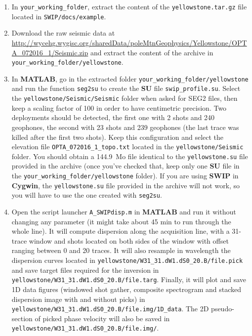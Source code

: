 \documentclass[twoside,a4paper]{article}
\def\SWIP{\textbf{SWIP}}
\def\SU{\textbf{SU}}
\def\MATLAB{\textbf{MATLAB}}
\def\Cygwin{\textbf{Cygwin}}
\begin{document}
\begin{enumerate}[leftmargin=*]
\setlength\itemsep{2ex}
\item In \verb|your_working_folder|, extract the content of the \verb|yellowstone.tar.gz| file located in \verb|SWIP/docs/example|.

\item Download the raw seismic data at \url{http://wycehg.wygisc.org/sharedData/poleMtnGeophysics/Yellowstone/OPTA_072016_1/Seismic.zip} and extract the content of the archive in \verb|your_working_folder/yellowstone|.

\item In {\MATLAB}, go in the extracted folder \verb|your_working_folder/yellowstone| and run the function \verb|seg2su| to create the {\SU} file \verb|swip_profile.su|. Select the \verb|yellowstone/Seismic/Seismic| folder when asked for SEG2 files, then keep a scaling factor of 100 in order to have centimetric precision. Two deployments should be detected, the first one with 2 shots and 240 geophones, the second with 23 shots and 239 geophones (the last trace was killed after the first two shots). Keep this configuration and select the elevation file \verb|OPTA_072016_1_topo.txt| located in the \verb|yellowstone/Seismic| folder. You should obtain a 144.9~Mo file identical to the \verb|yellowstone.su| file provided in the archive (once you've checked that, keep only one {\SU} file in the \verb|your_working_folder/yellowstone| folder). If you are using {\SWIP} in {\Cygwin}, the \verb|yellowstone.su| file provided in the archive will not work, so you will have to use the one created with \verb|seg2su|.

\item Open the script launcher \verb|A_SWIPdisp.m| in {\MATLAB} and run it without changing any parameter (it might take about 45 min to run through the whole line). It will compute dispersion along the acquisition line, with a 31-trace window and shots located on both sides of the window with offset ranging between 0 and 20 traces. It will also resample in wavelength the dispersion curves located in \verb|yellowstone/W31_31.dW1.dS0_20.B/file.pick| and save target files required for the inversion in \verb|yellowstone/W31_31.dW1.dS0_20.B/file.targ|. Finally, it will plot and save 1D data figures (windowed shot gather, composite spectrogram and stacked dispersion image with and without picks) in \verb|yellowstone/W31_31.dW1.dS0_20.B/file.img/1D_data|. The 2D pseudo-section of picked phase velocity will also be saved in \verb|yellowstone/W31_31.dW1.dS0_20.B/file.img/|.


\end{enumerate}
\end{document}
